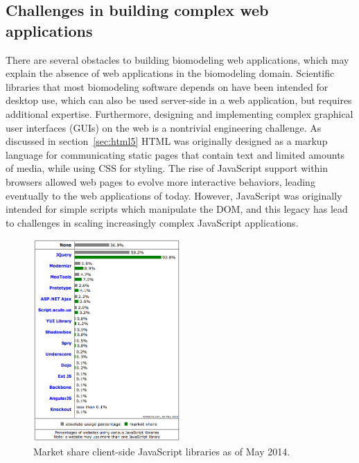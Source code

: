 \subsection{Challenges in building complex web applications}
There are several obstacles to building biomodeling web applications, which may explain the absence of web applications in the biomodeling domain.
Scientific libraries that most biomodeling software depends on have been intended for desktop use, which can also be used server-side in a web application, but requires additional expertise.
Furthermore, designing and implementing complex graphical user interfaces (GUIs) on the web is a nontrivial engineering challenge.
As discussed in section~\ref{sec:html5} HTML was originally designed as a markup language for communicating static pages that contain text and limited amounts of media, while using CSS for styling.
The rise of JavaScript support within browsers allowed web pages to evolve more interactive behaviors, leading eventually to the web applications of today.
However, JavaScript was originally intended for simple scripts which manipulate the DOM, and this legacy has lead to challenges in scaling increasingly complex JavaScript applications.

\begin{figure}
  \centering
  \includegraphics[width=0.5\textwidth,natwidth=610,natheight=642]{images/jquery-marketshare.png}
  \caption{Market share client-side JavaScript libraries as of May 2014. \autocite{w3techs2014javascript}}
  \label{fig:jquery-marketshare}
\end{figure}

